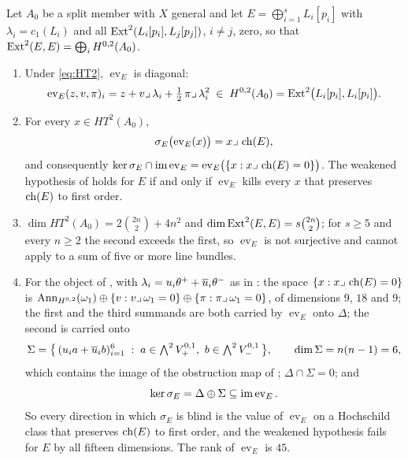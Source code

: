 \begin{proposition}\label{prop:evaluation}
Let $A_{0}$ be a split member with $X$ general and let
$E=\bigoplus_{i=1}^{s}L_{i}[p_{i}]$ with $\lambda_{i}=c_{1}(L_{i})$ and all
$\operatorname{Ext}^{2}(L_{i}[p_{i}],L_{j}[p_{j}])$, $i\ne j$, zero, so that
$\operatorname{Ext}^{2}(E,E)=\bigoplus_{i}H^{0,2}(A_{0})$.
\begin{enumerate}[label=\textup{(\roman*)},nosep]
\item Under \eqref{eq:HT2}, $\operatorname{ev}_{E}$ is diagonal:
  \begin{equation}\label{eq:evsplit}
    \operatorname{ev}_{E}(z,v,\pi)_{i}
    =z+v\lrcorner\,\lambda_{i}+\tfrac12\,\pi\lrcorner\,\lambda_{i}^{2}
    \;\in\;H^{0,2}(A_{0})=\operatorname{Ext}^{2}\bigl(L_{i}[p_{i}],L_{i}[p_{i}]\bigr).
  \end{equation}
\item For every $x\in HT^{2}(A_{0})$,
  \begin{equation}\label{eq:sigmaev}
    \sigma_{E}\bigl(\operatorname{ev}_{E}(x)\bigr)=x\lrcorner\,\operatorname{ch}(E),
  \end{equation}
  and consequently
  $\ker\sigma_{E}\cap\operatorname{im}\operatorname{ev}_{E}
   =\operatorname{ev}_{E}\bigl(\{x:x\lrcorner\,\operatorname{ch}(E)=0\}\bigr)$.
  The weakened hypothesis of \cite[Question 11.4]{Mar25b} holds for $E$ if
  and only if $\operatorname{ev}_{E}$ kills every $x$ that preserves
  $\operatorname{ch}(E)$ to first order.
\item $\dim HT^{2}(A_{0})=2\binom{2n}{2}+4n^{2}$ and
  $\dim\operatorname{Ext}^{2}(E,E)=s\binom{2n}{2}$; for $s\ge5$ and every $n\ge2$ the
  second exceeds the first, so $\operatorname{ev}_{E}$ is not surjective and
  \cite[Lemma 11.3]{Mar25b} cannot apply to a sum of five or more line
  bundles.
\item For the object of , with
  $\lambda_{i}=u_{i}\theta^{+}+\overline{u}_{i}\theta^{-}$ as in
  : the space $\{x:x\lrcorner\,\operatorname{ch}(E)=0\}$ is
  $\operatorname{Ann}_{H^{0,2}}(\omega_{1})\oplus\{v:v\lrcorner\,\omega_{1}=0\}\oplus
  \{\pi:\pi\lrcorner\,\omega_{1}=0\}$, of dimensions $9$, $18$ and $9$; the
  first and the third summands are both carried by $\operatorname{ev}_{E}$
  onto $\Delta$; the second is carried onto
  \[
    \Sigma=\bigl\{\,(u_{i}a+\bbar u_{i}b)_{i=1}^{6}\;:\;
      a\in\textstyle\bigwedge^{2}V_{+}^{0,1},\ b\in\bigwedge^{2}V_{-}^{0,1}\,\bigr\},
    \qquad \dim\Sigma=n(n-1)=6,
  \]
  which contains the image of the obstruction map of
  ; $\Delta\cap\Sigma=0$; and
  \[
    \ker\sigma_{E}=\Delta\oplus\Sigma\subseteq\operatorname{im}\operatorname{ev}_{E}.
  \]
  So every direction in which $\sigma_{E}$ is blind is the value of
  $\operatorname{ev}_{E}$ on a Hochschild class that preserves $\operatorname{ch}(E)$ to
  first order, and the weakened hypothesis fails for $E$ by all fifteen
  dimensions. The rank of $\operatorname{ev}_{E}$ is $45$.
\end{enumerate}
\end{proposition}

